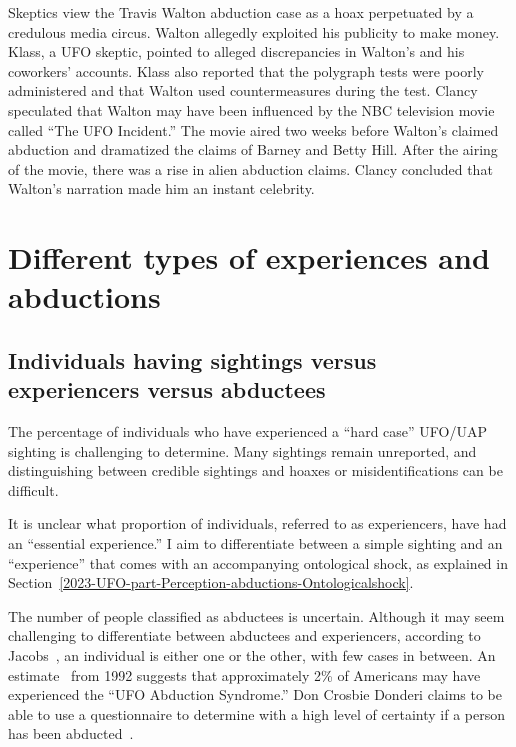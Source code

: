 Skeptics view the Travis Walton abduction case as a hoax perpetuated by a credulous media circus.
Walton allegedly exploited his publicity to make money.
Klass, a UFO skeptic, pointed to alleged discrepancies in Walton's and his coworkers' accounts.
Klass also reported that the polygraph tests were poorly administered and that Walton
used countermeasures during the test. Clancy speculated that Walton may have been influenced by the NBC television movie called
``The UFO Incident.'' The movie aired two weeks before Walton's claimed abduction and
dramatized the claims of Barney and Betty Hill. After the airing of the movie, there was a rise in alien abduction claims.
Clancy concluded that Walton's narration made him an instant celebrity.



\section{Different types of experiences and abductions}
\label{2023-UFO-part-Perception-abductions-dt}

\subsection{Individuals having sightings versus experiencers versus abductees}

The percentage of individuals who have experienced a ``hard case'' UFO/UAP sighting is challenging to determine. Many sightings remain unreported, and distinguishing between credible sightings and hoaxes or misidentifications can be difficult.

It is unclear what proportion of individuals, referred to as experiencers, have had an ``essential experience.'' I aim to differentiate between a simple sighting and an ``experience'' that comes with an accompanying ontological shock, as explained in Section~\ref{2023-UFO-part-Perception-abductions-Ontologicalshock}.

The number of people classified as abductees is uncertain. Although it may seem challenging to differentiate between abductees and experiencers, according to Jacobs~\cite{Jacobs2015Oct}, an individual is either one or the other, with few cases in between. An estimate~\cite{HJW1992,Donderi2013Mar} from 1992 suggests that approximately 2{\%}
of Americans may have experienced the ``UFO Abduction Syndrome.'' Don Crosbie Donderi claims to be able to use a questionnaire to determine with a high level of certainty if a person has been abducted~\cite{Donderi2013Jun}.

